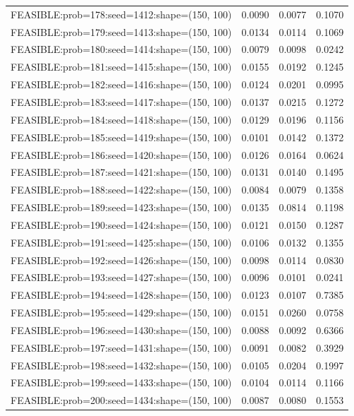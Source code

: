 \begin{longtable}{lccc}
FEASIBLE:prob=178:seed=1412:shape=(150, 100) & 0.0090 & 0.0077 & 0.1070 \\
FEASIBLE:prob=179:seed=1413:shape=(150, 100) & 0.0134 & 0.0114 & 0.1069 \\
FEASIBLE:prob=180:seed=1414:shape=(150, 100) & 0.0079 & 0.0098 & 0.0242 \\
FEASIBLE:prob=181:seed=1415:shape=(150, 100) & 0.0155 & 0.0192 & 0.1245 \\
FEASIBLE:prob=182:seed=1416:shape=(150, 100) & 0.0124 & 0.0201 & 0.0995 \\
FEASIBLE:prob=183:seed=1417:shape=(150, 100) & 0.0137 & 0.0215 & 0.1272 \\
FEASIBLE:prob=184:seed=1418:shape=(150, 100) & 0.0129 & 0.0196 & 0.1156 \\
FEASIBLE:prob=185:seed=1419:shape=(150, 100) & 0.0101 & 0.0142 & 0.1372 \\
FEASIBLE:prob=186:seed=1420:shape=(150, 100) & 0.0126 & 0.0164 & 0.0624 \\
FEASIBLE:prob=187:seed=1421:shape=(150, 100) & 0.0131 & 0.0140 & 0.1495 \\
FEASIBLE:prob=188:seed=1422:shape=(150, 100) & 0.0084 & 0.0079 & 0.1358 \\
FEASIBLE:prob=189:seed=1423:shape=(150, 100) & 0.0135 & 0.0814 & 0.1198 \\
FEASIBLE:prob=190:seed=1424:shape=(150, 100) & 0.0121 & 0.0150 & 0.1287 \\
FEASIBLE:prob=191:seed=1425:shape=(150, 100) & 0.0106 & 0.0132 & 0.1355 \\
FEASIBLE:prob=192:seed=1426:shape=(150, 100) & 0.0098 & 0.0114 & 0.0830 \\
FEASIBLE:prob=193:seed=1427:shape=(150, 100) & 0.0096 & 0.0101 & 0.0241 \\
FEASIBLE:prob=194:seed=1428:shape=(150, 100) & 0.0123 & 0.0107 & 0.7385 \\
FEASIBLE:prob=195:seed=1429:shape=(150, 100) & 0.0151 & 0.0260 & 0.0758 \\
FEASIBLE:prob=196:seed=1430:shape=(150, 100) & 0.0088 & 0.0092 & 0.6366 \\
FEASIBLE:prob=197:seed=1431:shape=(150, 100) & 0.0091 & 0.0082 & 0.3929 \\
FEASIBLE:prob=198:seed=1432:shape=(150, 100) & 0.0105 & 0.0204 & 0.1997 \\
FEASIBLE:prob=199:seed=1433:shape=(150, 100) & 0.0104 & 0.0114 & 0.1166 \\
FEASIBLE:prob=200:seed=1434:shape=(150, 100) & 0.0087 & 0.0080 & 0.1553 \\

\end{longtable}
